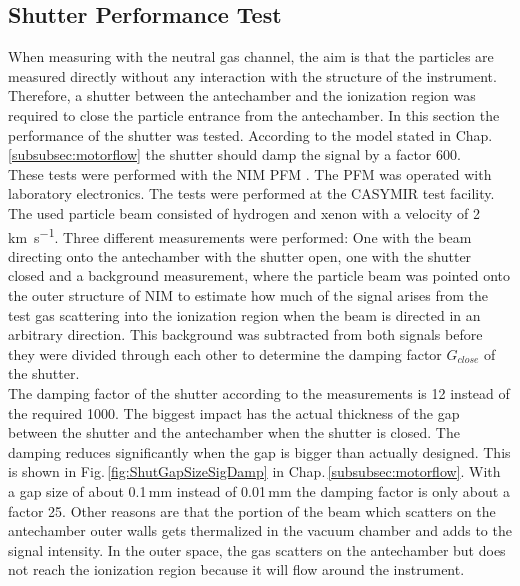 	\subsection{Shutter Performance Test}
	When measuring with the neutral gas channel, the aim is that the particles are measured directly without any interaction with the structure of the instrument. Therefore, a shutter between the antechamber and the ionization region was required to close the particle entrance from the antechamber. In this section the performance of the shutter was tested. According to the model stated in Chap.\ref{subsubsec:motorflow} the shutter should damp the signal by a factor 600.\\
	These tests were performed with the NIM PFM . The PFM was operated with laboratory electronics. The tests were performed at the CASYMIR test facility. The used particle beam consisted of hydrogen and xenon with a velocity of 2\,\si{\kilo\meter\per\second}. Three different measurements were performed: One with the beam directing onto the antechamber with the shutter open, one with the shutter closed and a background measurement, where the particle beam was pointed onto the outer structure of NIM to estimate how much of the signal arises from the test gas scattering into the ionization region when the beam is directed in an arbitrary direction. This background was subtracted from both signals before they were divided through each other to determine the damping factor $G_{close}$ of the shutter.\\
	The damping factor of the shutter according to the measurements is 12 instead of the required 1000. The biggest impact has the actual thickness of the gap between the shutter and the antechamber when the shutter is closed. The damping reduces significantly when the gap is bigger than actually designed. This is shown in Fig.\,\ref{fig:ShutGapSizeSigDamp} in Chap.\,\ref{subsubsec:motorflow}. With a gap size of about 0.1\,mm instead of 0.01\,mm the damping factor is only about a factor 25. Other reasons are that the portion of the beam which scatters on the antechamber outer walls gets thermalized in the vacuum chamber and adds to the signal intensity. In the outer space, the gas scatters on the antechamber but does not reach the ionization region because it will flow around the instrument.
	
